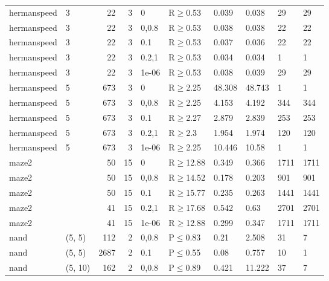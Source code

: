 \begin{longtable}{llrrllllll}
 hermanspeed   & 3         &     	22 &   3 & 0     & R$\geq$0.53  & 0.039   & 0.038   & 29      & 29   \\
 hermanspeed   & 3         &     	22 &   3 & 0,0.8 & R$\geq$0.53  & 0.038   & 0.038   & 22      & 22   \\
 hermanspeed   & 3         &     	22 &   3 & 0.1   & R$\geq$0.53  & 0.037   & 0.036   & 22      & 22   \\
 hermanspeed   & 3         &     	22 &   3 & 0.2,1 & R$\geq$0.53  & 0.034   & 0.034   & 1       & 1    \\
 hermanspeed   & 3         &     	22 &   3 & 1e-06 & R$\geq$0.53  & 0.038   & 0.039   & 29      & 29   \\
 hermanspeed   & 5         &    	673 &   3 & 0     & R$\geq$2.25  & 48.308  & 48.743  & 1       & 1    \\
 hermanspeed   & 5         &    	673 &   3 & 0,0.8 & R$\geq$2.25  & 4.153   & 4.192   & 344     & 344  \\
 hermanspeed   & 5         &    	673 &   3 & 0.1   & R$\geq$2.27  & 2.879   & 2.839   & 253     & 253  \\
 hermanspeed   & 5         &    	673 &   3 & 0.2,1 & R$\geq$2.3   & 1.954   & 1.974   & 120     & 120  \\
 hermanspeed   & 5         &    	673 &   3 & 1e-06 & R$\geq$2.25  & 10.446  & 10.58   & 1       & 1    \\
 maze2         &           &     	50 &  15 & 0     & R$\geq$12.88 & 0.349   & 0.366   & 1711    & 1711 \\
 maze2         &           &     	50 &  15 & 0,0.8 & R$\geq$14.52 & 0.178   & 0.203   & 901     & 901  \\
 maze2         &           &     	50 &  15 & 0.1   & R$\geq$15.77 & 0.235   & 0.263   & 1441    & 1441 \\
 maze2         &           &     	41 &  15 & 0.2,1 & R$\geq$17.68 & 0.542   & 0.63    & 2701    & 2701 \\
 maze2         &           &     	41 &  15 & 1e-06 & R$\geq$12.88 & 0.299   & 0.347   & 1711    & 1711 \\
 nand          & (5, 5)    &    	112 &   2 & 0,0.8 & P$\leq$0.83  & 0.21    & 2.508   & 31      & 7    \\
 nand          & (5, 5)    &   	2687 &   2 & 0.1   & P$\leq$0.55  & 0.08    & 0.757   & 10      & 1    \\
 nand          & (5, 10)   &    	162 &   2 & 0,0.8 & P$\leq$0.89  & 0.421   & 11.222  & 37      & 7    \\

\end{longtable}
